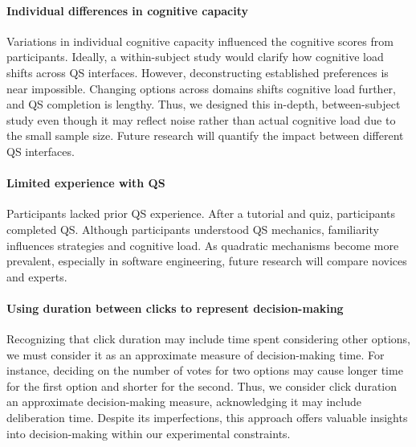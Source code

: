\paragraph{Individual differences in cognitive capacity}
Variations in individual cognitive capacity influenced the cognitive scores from participants. Ideally, a within-subject study would clarify how cognitive load shifts across QS interfaces. However, deconstructing established preferences is near impossible. Changing options across domains shifts cognitive load further, and QS completion is lengthy. Thus, we designed this in-depth, between-subject study even though it may reflect noise rather than actual cognitive load due to the small sample size. Future research will quantify the impact between different QS interfaces.

\paragraph{Limited experience with QS}
Participants lacked prior QS experience. After a tutorial and quiz, participants completed QS. Although participants understood QS mechanics, familiarity influences strategies and cognitive load. As quadratic mechanisms become more prevalent, especially in software engineering, future research will compare novices and experts.

\paragraph{Using duration between clicks to represent decision-making}
Recognizing that click duration may include time spent considering other options, we must consider it as an approximate measure of decision-making time. For instance, deciding on the number of votes for two options may cause longer time for the first option and shorter for the second. Thus, we consider click duration an approximate decision-making measure, acknowledging it may include deliberation time. Despite its imperfections, this approach offers valuable insights into decision-making within our experimental constraints.



